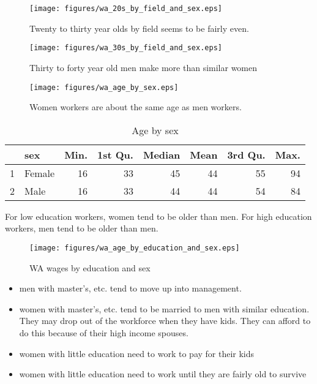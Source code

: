 \documentclass{exam}
\begin{document}
  
  \begin{figure}[H]
    \centering
    \texttt{[image: figures/wa\_20s\_by\_field\_and\_sex.eps]}
    \caption{Twenty to thirty year olds by field seems to be fairly even.}
  \end{figure}

  \begin{figure}[H]
    \centering
    \texttt{[image: figures/wa\_30s\_by\_field\_and\_sex.eps]}
    \caption{ Thirty to forty year old men make more than similar women }
  \end{figure}

  \begin{figure}[H]
    \centering
    \texttt{[image: figures/wa\_age\_by\_sex.eps]}
    \caption{Women workers are about the same age as men workers.}
  \end{figure}

  \begin{table}[ht]
    \centering
    \begin{tabular}{rlrrrrrr}
      \toprule
        & sex    & Min. & 1st Qu. & Median & Mean & 3rd Qu. & Max. \\
      \midrule
      1 & Female & 16   & 33      & 45     & 44   & 55      & 94 \\
      2 & Male   & 16   & 33      & 44     & 44   & 54      & 84 \\
      \bottomrule
    \end{tabular}
    \caption{Age by sex}
  \end{table}

  For low education workers, women tend to be older than men.  For high education workers, men tend to be older than
  men.  
  \begin{figure}[H]
    \centering
    \texttt{[image: figures/wa\_age\_by\_education\_and\_sex.eps]}
    \caption{WA wages by education and sex}
  \end{figure}

  \begin{itemize}
    \item men with master's, etc. tend to move up into management. 

    \item women with master's, etc. tend to be married to men with similar education.  They may drop out of the
      workforce when they have kids.  They can afford to do this because of their high income spouses.

    \item women with little education need to work to pay for their kids

    \item women with little education need to work until they are fairly old to survive

  \end{itemize}
\end{document}
